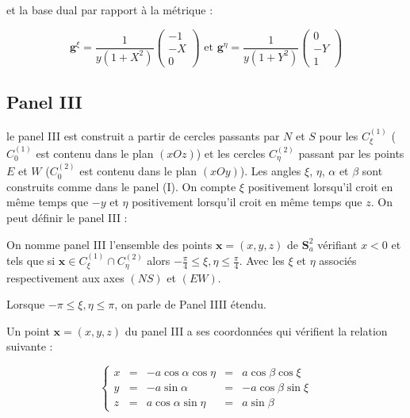 et la base dual par rapport à la métrique :

\begin{equation}
\mathbf{g}^{\xi} = \dfrac{1}{y(1+X^2)}\begin{pmatrix}
-1 \\ -X \\ 0
\end{pmatrix} \text{ et } \mathbf{g}^{\eta} = \dfrac{1}{y(1+Y^2)}\begin{pmatrix}
0 \\ -Y \\ 1
\end{pmatrix}
\label{eq: base duale II}
\end{equation}














\subsection{Panel III}

le panel III est construit a partir de cercles passants par $N$ et $S$ pour les $C_{\xi}^{(1)}$ ($C_{0}^{(1)}$ est contenu dans le plan $(xOz)$) et les cercles $C_{\eta}^{(2)}$ passant par les points $E$ et $W$ ($C_{0}^{(2)}$ est contenu dans le plan $(xOy)$). Les angles $\xi$, $\eta$, $\alpha$ et $\beta$ sont construits comme dans le panel (I). On compte $\xi$ positivement lorsqu'il croit en même temps que $-y$ et $\eta$ positivement lorsqu'il croit en même temps que $z$.
On peut définir le panel III :

\begin{definition}
On nomme panel III l'ensemble des points $\mathbf{x}=(x,y,z)$ de $\mathbf{S}_a^2$ vérifiant $x<0$ et tels que si $\mathbf{x} \in C_{\xi}^{(1)} \cap C_{\eta}^{(2)}$ alors $-\frac{\pi}{4}\leq \xi,\eta \leq \frac{\pi}{4}$. Avec les $\xi$ et $\eta$ associés respectivement aux axes $(NS)$ et $(EW)$.

Lorsque $-\pi \leq \xi,\eta \leq \pi$, on parle de Panel IIII étendu.
\end{definition}

Un point $\mathbf{x}=(x,y,z)$ du panel III a ses coordonnées qui vérifient la relation suivante :

\begin{equation}
\left\lbrace
\begin{array}{rcccc}
x & = & - a \cos \alpha \cos \eta & = & a \cos \beta \cos \xi \\
y & = & - a \sin \alpha & = & - a \cos \beta \sin \xi \\
z & = & a \cos \alpha \sin \eta & = & a \sin \beta
\end{array}
\right.
\end{equation}

